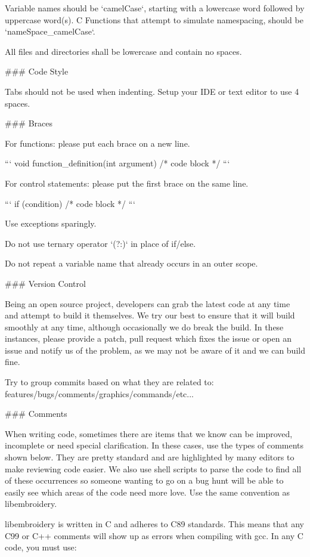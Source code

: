 Variable names should be `camelCase`, starting with a lowercase word followed by uppercase word(s).
C Functions that attempt to simulate namespacing, should be `nameSpace\_camelCase`.

All files and directories shall be lowercase and contain no spaces.

### Code Style

Tabs should not be used when indenting. Setup your IDE or text editor to use 4 spaces.

### Braces

For functions: please put each brace on a new line.

```
void
function_definition(int argument)
{
    /* code block */
}
```

For control statements: please put the first brace on the same line.

```
if (condition) {
    /* code block */    
}
```

Use exceptions sparingly.

Do not use ternary operator `(?:)` in place of if/else.

Do not repeat a variable name that already occurs in an outer scope.

### Version Control

Being an open source project, developers can grab the latest code at any time
and attempt to build it themselves. We try our best to ensure that it will build smoothly
at any time, although occasionally we do break the build. In these instances,
please provide a patch, pull request which fixes the issue or open an issue and
notify us of the problem, as we may not be aware of it and we can build fine.

Try to group commits based on what they are related to: features/bugs/comments/graphics/commands/etc...

### Comments

When writing code, sometimes there are items that we know can be improved,
incomplete or need special clarification. In these cases, use the types of
comments shown below. They are pretty standard and are highlighted by many editors to
make reviewing code easier. We also use shell scripts to parse the code to find
all of these occurrences so someone wanting to go on a bug hunt will be able to
easily see which areas of the code need more love. Use the same convention
as libembroidery.

libembroidery is written in C and adheres to C89 standards. This means
that any C99 or C++ comments will show up as errors when compiling with
gcc. In any C code, you must use:

